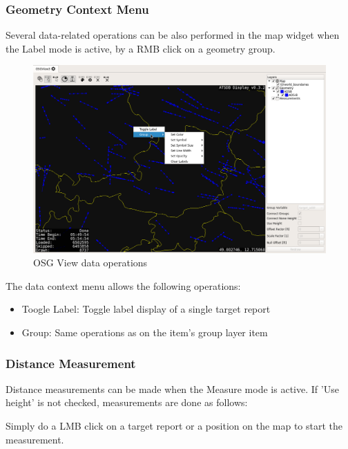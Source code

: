 {\subsubsection{Geometry Context Menu}

Several data-related operations can be also performed in the map widget when the Label mode is active, by a RMB click on a geometry group.


\begin{figure}[H]
    \hspace*{-2cm}
    \includegraphics[width=18cm,frame]{../screenshots/osgview_data_operations.png}
  \caption{OSG View data operations}
\end{figure}

The data context menu allows the following operations:

\begin{itemize}
 \item Toogle Label: Toggle label display of a single target report
 \item Group: Same operations as on the item's group layer item
\end{itemize}

\subsubsection{Distance Measurement}

Distance measurements can be made when the Measure mode is active. If 'Use height' is not checked, measurements are done as follows:

Simply do a LMB click on a target report or a position on the map to start the measurement.

}
